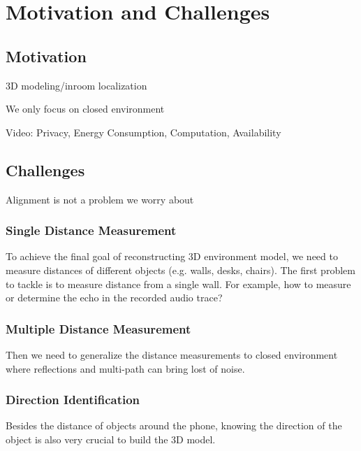 \section{Motivation and Challenges}
\label{sec:motivation}

\subsection{Motivation}

3D modeling/inroom localization

We only focus on closed environment

Video: Privacy, Energy Consumption, Computation, Availability


\subsection{Challenges}

Alignment is not a problem we worry about


\subsubsection{Single Distance Measurement}

To achieve the final goal of reconstructing 3D environment model, 
we need to measure distances of different objects (e.g. walls, desks, chairs).
The first problem to tackle is to measure distance from a single wall. 
For example, how to measure or determine the echo in the recorded audio trace?



\subsubsection{Multiple Distance Measurement}

Then we need to generalize the distance measurements to closed environment 
where reflections and multi-path can bring lost of noise.



\subsubsection{Direction Identification}

Besides the distance of objects around the phone, knowing the direction of the 
object is also very crucial to build the 3D model. 

